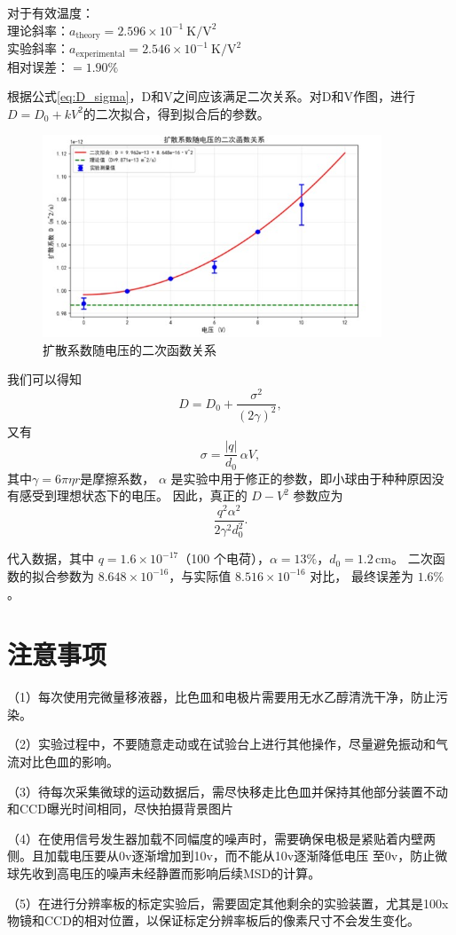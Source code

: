 \documentclass[a4paper]{report} %
\begin{document}
对于有效温度：\\
理论斜率：$a_{\text{theory}} = 2.596 \times 10^{-1} \ \text{K}/\text{V}^2$ \\ 
实验斜率：$a_{\text{experimental}} = 2.546 \times 10^{-1} \ \text{K}/\text{V}^2$ \\ 
相对误差：$= 1.90\%$\par
根据公式\eqref{eq:D_sigma}，D和V之间应该满足二次关系。对D和V作图，进行$D = D_0 + kV^2$的二次拟合，得到拟合后的参数。
\begin{figure}[H]
    \centering
    \includegraphics[width=0.9\textwidth]{二次拟合.jpg}
    \caption{扩散系数随电压的二次函数关系}
    \label{fig:fit2V}
\end{figure}
我们可以得知
\begin{equation}
    D = D_0 + \frac{\sigma^2}{(2\gamma)^2},
\end{equation}
又有
\begin{equation}
    \sigma = \frac{|q|}{d_0}\,\alpha V,
\end{equation}
其中$\gamma = 6 \pi \eta r$是摩擦系数， $\alpha$ 是实验中用于修正的参数，即小球由于种种原因没有感受到理想状态下的电压。  
因此，真正的 $D\!-\!V^2$ 参数应为
\begin{equation}
    \frac{q^2 \alpha^2}{2 \gamma^2 d_0^2}.
\end{equation}

代入数据，其中 $q = 1.6\times 10^{-17}$（100 个电荷），$\alpha = 13\%$，$d_0 = 1.2\,\mathrm{cm}$。  
二次函数的拟合参数为 $8.648\times 10^{-16}$，与实际值 $8.516\times 10^{-16}$ 对比，  
最终误差为 $1.6\%$。

\section{注意事项}
（1）每次使用完微量移液器，比色皿和电极片需要用无水乙醇清洗干净，防止污染。\par
（2）实验过程中，不要随意走动或在试验台上进行其他操作，尽量避免振动和气流对比色皿的影响。\par
（3）待每次采集微球的运动数据后，需尽快移走比色皿并保持其他部分装置不动和CCD曝光时间相同，尽快拍摄背景图片 \par
（4）在使用信号发生器加载不同幅度的噪声时，需要确保电极是紧贴着内壁两侧。且加载电压要从0v逐渐增加到10v，而不能从10v逐渐降低电压
至0v，防止微球先收到高电压的噪声未经静置而影响后续MSD的计算。\par
（5）在进行分辨率板的标定实验后，需要固定其他剩余的实验装置，尤其是100x物镜和CCD的相对位置，以保证标定分辨率板后的像素尺寸不会发生变化。\par
\end{document}

